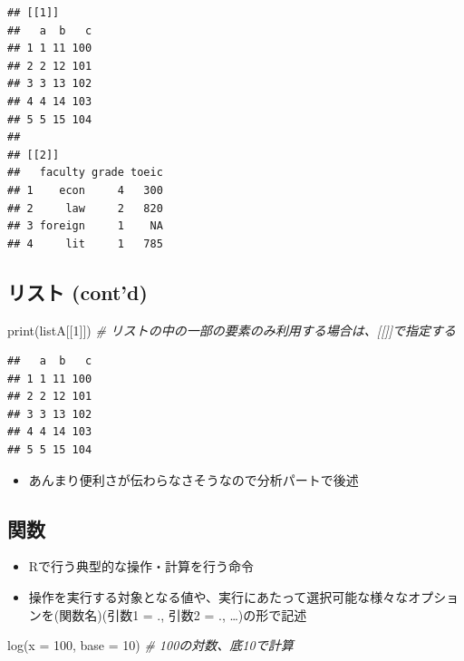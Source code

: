 \documentclass[
]{ltjsarticle}
\newenvironment{Shaded}{\begin{snugshade}}{\end{snugshade}}
\newcommand{\AttributeTok}[1]{\textcolor[rgb]{0.77,0.63,0.00}{#1}}
\newcommand{\CommentTok}[1]{\textcolor[rgb]{0.56,0.35,0.01}{\textit{#1}}}
\newcommand{\DecValTok}[1]{\textcolor[rgb]{0.00,0.00,0.81}{#1}}
\newcommand{\FunctionTok}[1]{\textcolor[rgb]{0.00,0.00,0.00}{#1}}
\newcommand{\NormalTok}[1]{#1}
\providecommand{\tightlist}{%
  \setlength{\itemsep}{0pt}\setlength{\parskip}{0pt}}
\begin{document}
\begin{verbatim}
## [[1]]
##   a  b   c
## 1 1 11 100
## 2 2 12 101
## 3 3 13 102
## 4 4 14 103
## 5 5 15 104
## 
## [[2]]
##   faculty grade toeic
## 1    econ     4   300
## 2     law     2   820
## 3 foreign     1    NA
## 4     lit     1   785
\end{verbatim}

\hypertarget{ux30eaux30b9ux30c8-contd}{%
\subsection{リスト (cont'd)}\label{ux30eaux30b9ux30c8-contd}}

\begin{Shaded}
\begin{Highlighting}[]
\FunctionTok{print}\NormalTok{(listA[[}\DecValTok{1}\NormalTok{]]) }\CommentTok{\# リストの中の一部の要素のみ利用する場合は、[[]]で指定する}
\end{Highlighting}
\end{Shaded}

\begin{verbatim}
##   a  b   c
## 1 1 11 100
## 2 2 12 101
## 3 3 13 102
## 4 4 14 103
## 5 5 15 104
\end{verbatim}

\begin{itemize}
\tightlist
\item
  あんまり便利さが伝わらなさそうなので分析パートで後述
\end{itemize}

\hypertarget{ux95a2ux6570}{%
\subsection{関数}\label{ux95a2ux6570}}

\begin{itemize}
\tightlist
\item
  Rで行う典型的な操作・計算を行う命令
\item
  操作を実行する対象となる値や、実行にあたって選択可能な様々なオプションを(関数名)(引数1
  = ., 引数2 = ., \ldots)の形で記述
\end{itemize}

\begin{Shaded}
\begin{Highlighting}[]
\FunctionTok{log}\NormalTok{(}\AttributeTok{x =} \DecValTok{100}\NormalTok{, }\AttributeTok{base =} \DecValTok{10}\NormalTok{) }\CommentTok{\# 100の対数、底10で計算}
\end{Highlighting}
\end{Shaded}
\end{document}

